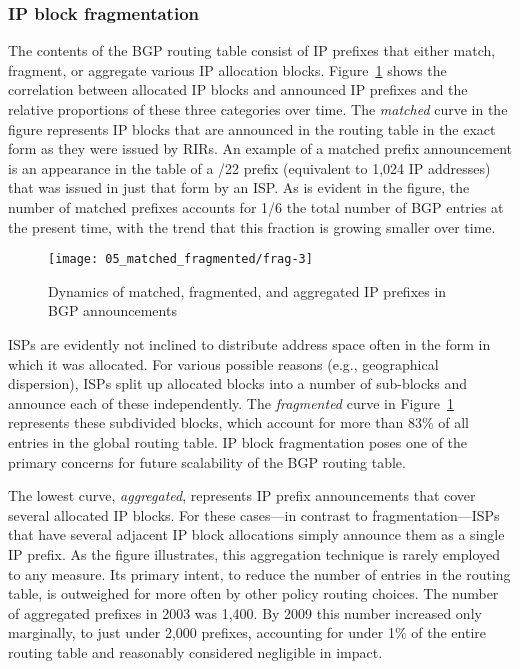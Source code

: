 \subsubsection{IP block fragmentation}

The contents of the BGP routing table consist of IP prefixes that either match,
fragment, or aggregate various IP allocation blocks.
Figure~\ref{fig:fragmentation} shows the correlation between allocated IP
blocks and announced IP prefixes and the relative proportions of these three
categories over time. The \emph{matched} curve in the figure represents IP
blocks that are announced in the routing table in the exact form as they were
issued by RIRs. An example of a matched prefix announcement is an appearance in
the table of a /22 prefix (equivalent to 1,024 IP addresses) that was issued in
just that form by an ISP. As is evident in the figure, the number of matched
prefixes accounts for 1/6 the total number of BGP entries at the present time,
with the trend that this fraction is growing smaller over time.

\begin{figure}[htbp]
	\centering
		\texttt{[image: 05\_matched\_fragmented/frag-3]}
	\caption{Dynamics of matched, fragmented, and aggregated IP prefixes in BGP announcements}
	\label{fig:fragmentation}
\end{figure}

ISPs are evidently not inclined to distribute address space often in the form
in which it was allocated. For various possible reasons (e.g., geographical
dispersion), ISPs split up allocated blocks into a number of sub-blocks and
announce each of these independently. The \emph{fragmented} curve in
Figure~\ref{fig:fragmentation} represents these subdivided blocks, which
account for more than 83\% of all entries in the global routing table. IP block
fragmentation poses one of the primary concerns for future scalability of the
BGP routing table.

The lowest curve, \emph{aggregated}, represents IP prefix announcements that
cover several allocated IP blocks. For these cases---in contrast to
fragmentation---ISPs that have several adjacent IP block allocations simply
announce them as a single IP prefix. As the figure illustrates, this
aggregation technique is rarely employed to any measure. Its primary intent, to
reduce the number of entries in the routing table, is outweighed for more often
by other policy routing choices. The number of aggregated prefixes in 2003 was
1,400. By 2009 this number increased only marginally, to just under 2,000
prefixes, accounting for under 1\% of the entire routing table and reasonably
considered negligible in impact.

